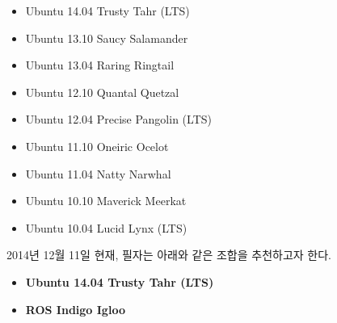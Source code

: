 \begin{itemize}
\item Ubuntu 14.04 Trusty Tahr (LTS)
\item Ubuntu 13.10 Saucy Salamander
\item Ubuntu 13.04 Raring Ringtail 
\item Ubuntu 12.10 Quantal Quetzal 
\item Ubuntu 12.04 Precise Pangolin (LTS)
\item Ubuntu 11.10 Oneiric Ocelot
\item Ubuntu 11.04 Natty Narwhal
\item Ubuntu 10.10 Maverick Meerkat
\item Ubuntu 10.04 Lucid Lynx (LTS)\\
\end{itemize}

2014년 12월 11일 현재, 필자는 아래와 같은 조합을 추천하고자 한다.\\

\begin{itemize}
\item \textbf{Ubuntu 14.04 Trusty Tahr (LTS)}
\item \textbf{ROS Indigo Igloo}
\end{itemize}

